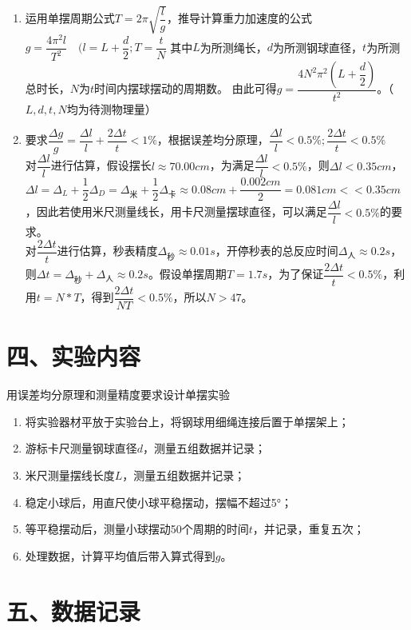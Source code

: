 \documentclass[11pt]{article}
\begin{document}
\begin{enumerate}
    \item 运用单摆周期公式$T=2\pi\sqrt{\dfrac{l}{g}}$，推导计算重力加速度的公式$g=\dfrac{4\pi ^2l}{T^2}\quad (l=L+\dfrac{d}{2}; T=\dfrac{t}{N}$
    其中$L$为所测绳长，$d$为所测钢球直径，$t$为所测总时长，$N$为$t$时间内摆球摆动的周期数。
    由此可得$g=\dfrac{4N^2\pi ^2\left(L+\dfrac{d}{2}\right)}{t^2}$。（$L,d,t,N$均为待测物理量）
    \item 要求$\dfrac{\Delta g}{g}=\dfrac{\Delta l}{l}+\dfrac{2\Delta t}{t}<1\%$，根据误差均分原理，$\dfrac{\Delta l}{l}<0.5\%; \dfrac{2\Delta t}{t}<0.5\%$\\
    对$\dfrac{\Delta l}{l}$进行估算，假设摆长$l\approx70.00cm$，为满足$\dfrac{\Delta l}{l}<0.5\%$，则$\Delta l<0.35cm$，$\Delta l=\Delta_L+\dfrac{1}{2}\Delta_D=\Delta_{\text{米}}+\dfrac{1}{2}\Delta_{\text{卡}}\approx0.08cm+\dfrac{0.002cm}{2}=0.081cm<<0.35cm$，因此若使用米尺测量线长，用卡尺测量摆球直径，可以满足$\dfrac{\Delta l}{l}<0.5\%$的要求。\\
    对$\dfrac{2\Delta t}{t}$进行估算，秒表精度$\Delta_{\text{秒}}\approx0.01s$，开停秒表的总反应时间$\Delta_{\text{人}}\approx0.2s$，则$\Delta t=\Delta_{\text{秒}}+\Delta_{\text{人}}\approx0.2s$。假设单摆周期$T=1.7s$，为了保证$\dfrac{2\Delta t}{t}<0.5\%$，利用$t=N*T$，得到$\dfrac{2\Delta t}{NT}<0.5\%$，所以$N>47$。
\end{enumerate}

\section*{四、实验内容}

用误差均分原理和测量精度要求设计单摆实验

\begin{enumerate}
    \item 将实验器材平放于实验台上，将钢球用细绳连接后置于单摆架上；
    \item 游标卡尺测量钢球直径$d$，测量五组数据并记录；
    \item 米尺测量摆线长度$L$，测量五组数据并记录；
    \item 稳定小球后，用直尺使小球平稳摆动，摆幅不超过5°；
    \item 等平稳摆动后，测量小球摆动50个周期的时间$t$，并记录，重复五次；
    \item 处理数据，计算平均值后带入算式得到$g$。
\end{enumerate}

\section*{五、数据记录}
\end{document}
